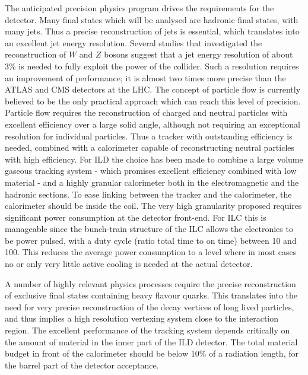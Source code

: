 \documentclass[%
 amsmath,amssymb,
 aps,
 longbibliography,
]{revtex4-1}
\begin{document}

The anticipated precision physics program drives the requirements for the detector. Many final states which will be analysed are hadronic final states, with many jets. Thus a precise reconstruction of jets is essential, which translates into an excellent jet energy resolution. Several studies that investigated the reconstruction of $W$ and $Z$ bosons suggest that a jet energy resolution of about 3\% is needed to fully exploit the power of the collider. Such a resolution requires an improvement of performance; it is almost two times more precise than the ATLAS and CMS detectors at the LHC. The concept of particle flow is currently believed to be the only practical approach which can reach this level of precision. Particle flow requires the reconstruction of charged and neutral particles with excellent efficiency over a large solid angle, although not requiring an exceptional  resolution for individual particles. Thus a tracker with outstanding efficiency is needed, combined with a calorimeter capable of reconstructing neutral particles with high efficiency. For ILD the choice has been made to combine a large volume gaseous tracking system - which promises excellent efficiency combined with low material - and a highly granular calorimeter both in the electromagnetic and the hadronic sections. To ease linking between the tracker and the calorimeter, the calorimeter should be inside the coil. The very high granularity proposed requires significant power consumption at the detector front-end. For ILC this is manageable since the bunch-train structure of the ILC allows the electronics to be power pulsed, with a duty cycle (ratio total time to on time) between 10 and 100. This reduces the average power consumption to a level where in most cases no or only very little active cooling is needed at the actual detector. 

A number of highly relevant physics processes require the precise reconstruction of exclusive final states containing heavy flavour quarks. This translates into the need for very precise reconstruction of the decay vertices of long lived particles, and thus implies a high resolution vertexing system close to the interaction region. 
The excellent performance of the tracking system depends critically on the amount of material in the inner part of the ILD detector. The total material budget in front of the calorimeter should be below 10\% of a radiation length, for the barrel part of the detector acceptance.
\end{document}
